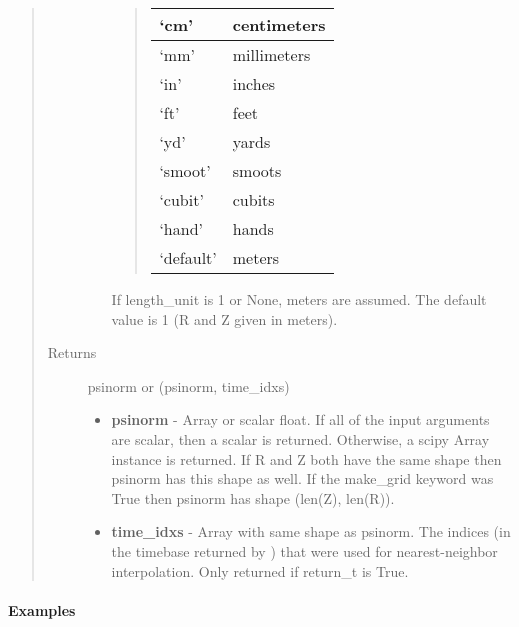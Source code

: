 \documentclass[letterpaper,10pt,english]{sphinxmanual}
\begin{document}
\begin{fulllineitems}
\begin{fulllineitems}
\begin{quote}
\begin{description}
\begin{itemize}
\begin{quote}
\begin{tabulary}{\linewidth}{|L|L|}
`cm'
 & 
centimeters
\\\hline

`mm'
 & 
millimeters
\\\hline

`in'
 & 
inches
\\\hline

`ft'
 & 
feet
\\\hline

`yd'
 & 
yards
\\\hline

`smoot'
 & 
smoots
\\\hline

`cubit'
 & 
cubits
\\\hline

`hand'
 & 
hands
\\\hline

`default'
 & 
meters
\\\hline
\end{tabulary}

\end{quote}

If length\_unit is 1 or None, meters are assumed. The default
value is 1 (R and Z given in meters).

\end{itemize}

\item[{Returns}] \leavevmode

psinorm or (psinorm, time\_idxs)
\begin{itemize}
\item {} 
\textbf{psinorm} - Array or scalar float. If all of the input arguments are
scalar, then a scalar is returned. Otherwise, a scipy Array
instance is returned. If R and Z both have the same shape then
psinorm has this shape as well. If the make\_grid keyword was
True then psinorm has shape (len(Z), len(R)).

\item {} 
\textbf{time\_idxs} - Array with same shape as psinorm. The indices (in the
timebase returned by {\hyperref[eqtools:eqtools.core.Equilibrium.getTimeBase]{}}) that were used for
nearest-neighbor interpolation. Only returned if return\_t is True.

\end{itemize}


\end{description}\end{quote}
\paragraph{Examples}


\end{fulllineitems}
\end{fulllineitems}
\end{document}
